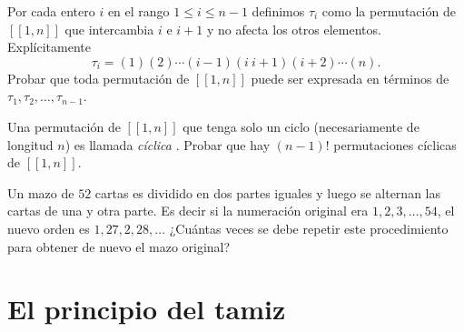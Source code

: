 \begin{enumex}
\item Por cada entero $i$ en el rango $1 \le i \le n-1$ definimos $\tau_i$ como la permutación de $[[1,n]]$ que intercambia $i$ e $i+1$ y no afecta los otros elementos. Explícitamente 
$$
\tau_i = (1)(2)\cdots(i-1)(i\ i+1)(i+2)\cdots(n).
$$
Probar que toda permutación de $[[1,n]]$ puede ser expresada en términos de $\tau_1,\tau_2,\ldots,\tau_{n-1}$. 

\item Una permutación de $[[1,n]]$ que tenga solo un ciclo (necesariamente de longitud $n$) es llamada \textit{cíclica}  . Probar que hay $(n-1)!$ permutaciones cíclicas de $[[1,n]]$.

\item Un mazo de $52$ cartas es dividido en dos partes iguales y luego se alternan las cartas de una y otra parte. Es decir si la numeración original era $1,2,3,\ldots,54$, el nuevo orden es $1,27,2,28,\ldots$ ¿Cuántas veces se debe repetir este procedimiento para obtener de nuevo el mazo original? 
\end{enumex}


\chapter[El principio del tamiz]{El principio del tamiz} \label{ape.principio_del_tamiz}

